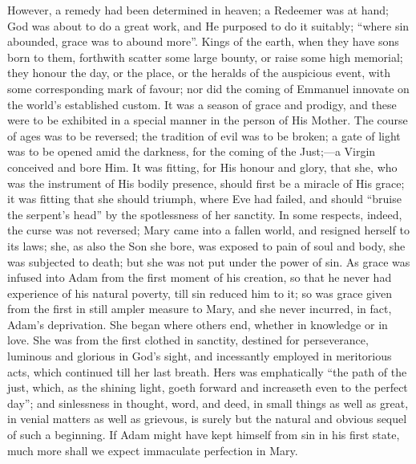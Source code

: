 However, a remedy had been determined in heaven; a Redeemer was at
hand; God was about to do a great work, and He purposed to do it
suitably; ``where sin abounded, grace was to abound more''.
Kings of the earth, when they have sons born to them, forthwith
scatter some large bounty, or raise some high memorial; they honour
the day, or the place, or the heralds of the auspicious event, with
some corresponding mark of favour; nor did the coming of Emmanuel
innovate on the world's established custom. It was a season of grace
and prodigy, and these were to be exhibited in a special manner in the
person of His Mother. The course of ages was to be reversed; the
tradition of evil was to be broken; a gate of light was to be opened
amid the darkness, for the coming of the Just;—a Virgin conceived
and bore Him. It was fitting, for His honour and glory, that she, who
was the instrument of His bodily presence, should first be a miracle
of His grace; it was fitting that she should triumph, where Eve had
failed, and should ``bruise the serpent's head'' by the
spotlessness of her sanctity. In some respects, indeed, the curse was
not reversed; Mary came into a fallen world, and resigned herself to
its laws; she, as also the Son she bore, was exposed to pain of soul
and body, she was subjected to death; but she was not put under the
power of sin. As grace was infused into Adam from the first moment of
his creation, so that he never had experience of his natural poverty,
till sin reduced him to it; so was grace given from the first in still
ampler measure to Mary, and she never incurred, in fact, Adam's
deprivation. She began where others end, whether in knowledge or in
love. She was from the first clothed in sanctity, destined for
perseverance, luminous and glorious in God's sight, and incessantly
employed in meritorious acts, which continued till her last breath.
Hers was emphatically ``the path of the just, which, as the
shining light, goeth forward and increaseth even to the perfect
day''; and sinlessness in thought, word, and deed, in small things
as well as great, in venial matters as well as grievous, is surely but
the natural and obvious sequel of such a beginning. If Adam might have
kept himself from sin in his first state, much more shall we expect
immaculate perfection in Mary.

